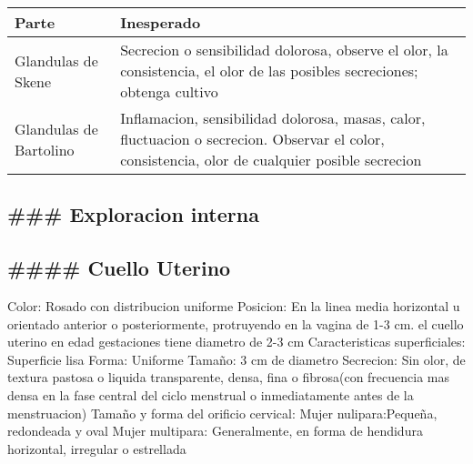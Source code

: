 \documentclass[
]{article}
\begin{document}
\begin{longtable}[]{@{}ll@{}}
\toprule
\begin{minipage}[b]{0.14\columnwidth}\raggedright
Parte\strut
\end{minipage} & \begin{minipage}[b]{0.80\columnwidth}\raggedright
Inesperado\strut
\end{minipage}\tabularnewline
\midrule
\endhead
\begin{minipage}[t]{0.14\columnwidth}\raggedright
Glandulas de Skene\strut
\end{minipage} & \begin{minipage}[t]{0.80\columnwidth}\raggedright
Secrecion o sensibilidad dolorosa, observe el olor, la consistencia, el
olor de las posibles secreciones; obtenga cultivo\strut
\end{minipage}\tabularnewline
\begin{minipage}[t]{0.14\columnwidth}\raggedright
Glandulas de Bartolino\strut
\end{minipage} & \begin{minipage}[t]{0.80\columnwidth}\raggedright
Inflamacion, sensibilidad dolorosa, masas, calor, fluctuacion o
secrecion. Observar el color, consistencia, olor de cualquier posible
secrecion\strut
\end{minipage}\tabularnewline
\bottomrule
\end{longtable}

\hypertarget{exploracion-interna}{%
\subsection{\#\#\# Exploracion interna}\label{exploracion-interna}}

\hypertarget{cuello-uterino}{%
\subsection{\#\#\#\# Cuello Uterino}\label{cuello-uterino}}

Color: Rosado con distribucion uniforme Posicion: En la linea media
horizontal u orientado anterior o posteriormente, protruyendo en la
vagina de 1-3 cm. el cuello uterino en edad gestaciones tiene diametro
de 2-3 cm Caracteristicas superficiales: Superficie lisa Forma: Uniforme
Tamaño: 3 cm de diametro Secrecion: Sin olor, de textura pastosa o
liquida transparente, densa, fina o fibrosa(con frecuencia mas densa en
la fase central del ciclo menstrual o inmediatamente antes de la
menstruacion) Tamaño y forma del orificio cervical: Mujer
nulipara:Pequeña, redondeada y oval Mujer multipara: Generalmente, en
forma de hendidura horizontal, irregular o estrellada
\end{document}

